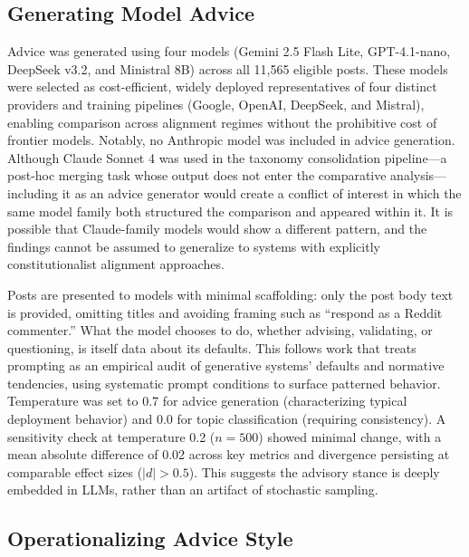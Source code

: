 \subsection{Generating Model Advice}

Advice was generated using four models (Gemini 2.5 Flash Lite, GPT-4.1-nano, DeepSeek v3.2, and Ministral 8B) across all 11,565 eligible posts. These models were selected as cost-efficient, widely deployed representatives of four distinct providers and training pipelines (Google, OpenAI, DeepSeek, and Mistral), enabling comparison across alignment regimes without the prohibitive cost of frontier models. Notably, no Anthropic model was included in advice generation. Although Claude Sonnet 4 was used in the taxonomy consolidation pipeline---a post-hoc merging task whose output does not enter the comparative analysis---including it as an advice generator would create a conflict of interest in which the same model family both structured the comparison and appeared within it. It is possible that Claude-family models would show a different pattern, and the findings cannot be assumed to generalize to systems with explicitly constitutionalist alignment approaches.

Posts are presented to models with minimal scaffolding: only the post body text is provided, omitting titles and avoiding framing such as ``respond as a Reddit commenter.'' What the model chooses to do, whether advising, validating, or questioning, is itself data about its defaults. This follows work that treats prompting as an empirical audit of generative systems' defaults and normative tendencies, using systematic prompt conditions to surface patterned behavior. Temperature was set to 0.7 for advice generation (characterizing typical deployment behavior) and 0.0 for topic classification (requiring consistency). A sensitivity check at temperature 0.2 ($n = 500$) showed minimal change, with a mean absolute difference of 0.02 across key metrics and divergence persisting at comparable effect sizes ($|d| > 0.5$). This suggests the advisory stance is deeply embedded in LLMs, rather than an artifact of stochastic sampling.

\subsection{Operationalizing Advice Style}

